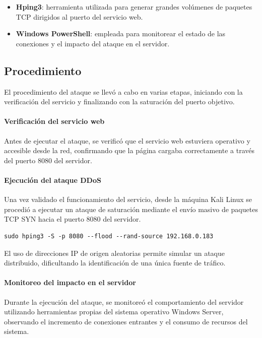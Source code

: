 \begin{itemize}
    \item \textbf{Hping3}: herramienta utilizada para generar grandes volúmenes de paquetes TCP dirigidos al puerto del servicio web.
    \item \textbf{Windows PowerShell}: empleada para monitorear el estado de las conexiones y el impacto del ataque en el servidor.
\end{itemize}

\subsection{Procedimiento}

El procedimiento del ataque se llevó a cabo en varias etapas, iniciando con la verificación del servicio y finalizando con la saturación del puerto objetivo.

\paragraph{Verificación del servicio web}

Antes de ejecutar el ataque, se verificó que el servicio web estuviera operativo y accesible desde la red, confirmando que la página cargaba correctamente a través del puerto 8080 del servidor.

\paragraph{Ejecución del ataque DDoS}

Una vez validado el funcionamiento del servicio, desde la máquina Kali Linux se procedió a ejecutar un ataque de saturación mediante el envío masivo de paquetes TCP SYN hacia el puerto 8080 del servidor.

\begin{lstlisting}[caption={Ejecución del ataque DDoS hacia el puerto 8080}]
sudo hping3 -S -p 8080 --flood --rand-source 192.168.0.183
\end{lstlisting}

El uso de direcciones IP de origen aleatorias permite simular un ataque distribuido, dificultando la identificación de una única fuente de tráfico.

\paragraph{Monitoreo del impacto en el servidor}

Durante la ejecución del ataque, se monitoreó el comportamiento del servidor utilizando herramientas propias del sistema operativo Windows Server, observando el incremento de conexiones entrantes y el consumo de recursos del sistema.

